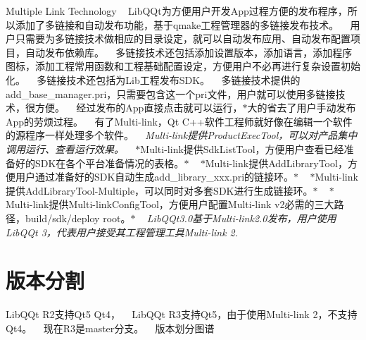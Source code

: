 Multiple Link Technology ~\newline
Lib\+Q\+Qt为方便用户开发\+App过程方便的发布程序，所以添加了多链接和自动发布功能，基于qmake工程管理器的多链接发布技术。 ~\newline
用户只需要为多链接技术做相应的目录设定，就可以自动发布应用、自动发布配置项目，自动发布依赖库。 ~\newline
 多链接技术还包括添加设置版本，添加语言，添加程序图标，添加工程常用函数和工程基础配置设定，方便用户不必再进行复杂设置初始化。 ~\newline
多链接技术还包括为\+Lib工程发布\+S\+D\+K。 ~\newline
多链接技术提供的add\+\_\+base\+\_\+manager.\+pri，只需要包含这一个pri文件，用户就可以使用多链接技术，很方便。 ~\newline
经过发布的\+App直接点击就可以运行，$\ast$大的省去了用户手动发布\+App的劳烦过程。 ~\newline
有了\+Multi-\/link，\+Qt C++软件工程师就好像在编辑一个软件的源程序一样处理多个软件。 ~\newline
 {\itshape Multi-\/link提供\+Product\+Exec\+Tool，可以对产品集中调用运行、查看运行效果。} ~\newline
$\ast$\+Multi-\/link提供\+Sdk\+List\+Tool，方便用户查看已经准备好的\+S\+D\+K在各个平台准备情况的表格。$\ast$ ~\newline
$\ast$\+Multi-\/link提供\+Add\+Library\+Tool，方便用户通过准备好的\+S\+D\+K自动生成add\+\_\+library\+\_\+xxx.pri的链接环。$\ast$ ~\newline
$\ast$\+Multi-\/link提供\+Add\+Library\+Tool-\/\+Multiple，可以同时对多套\+S\+D\+K进行生成链接环。$\ast$ ~\newline
$\ast$\+Multi-\/link提供\+Multi-\/link\+Config\+Tool，方便用户配置\+Multi-\/link v2必需的三大路径，build/sdk/deploy root。$\ast$ ~\newline
 {\itshape Lib\+Q\+Qt3.\+0基于\+Multi-\/link2.0发布，用户使用\+Lib\+Q\+Qt 3，代表用户接受其工程管理工具\+Multi-\/link 2.} ~\newline
 

 \section*{版本分割}

Lib\+Q\+Qt R2支持\+Qt5 Qt4， ~\newline
Lib\+Q\+Qt R3支持\+Qt5，由于使用\+Multi-\/link 2，不支持\+Qt4。 ~\newline
现在\+R3是master分支。 ~\newline
版本划分图谱 ~\newline
 

